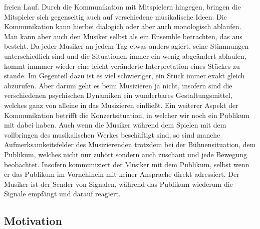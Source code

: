 freien Lauf. Durch die Kommunikation mit Mitspielern hingegen, bringen die
Mitspieler sich gegenseitig auch auf verschiedene musikalische Ideen. Die
Kommunikation kann hierbei dialogich oder aber auch monologisch ablaufen.
\autocite[61]{doerne:umfassend_musizieren} Man kann aber auch den Musiker selbst
als ein Ensemble betrachten, das aus  besteht.
\autocite[64]{doerne:umfassend_musizieren} Da jeder Musiker an jedem Tag etwas
anders agiert, seine Stimmungen unterschiedlich sind und die Situationen immer
ein wenig abgeändert ablaufen, kommt immmer wieder eine leicht veränderte
Interpretation eines Stückes zu stande. Im Gegenteil dazu ist es viel
schwieriger, ein Stück immer exakt gleich abzurufen. Aber darum geht es beim
Musizieren ja nicht, insofern sind die verschiedenen psychischen Dynamiken ein
wunderbares Gestaltungsmittel, welches ganz von alleine in das Musizieren
einfließt. Ein weiterer Aspekt der Kommunikation betrifft die Konzertsituation,
in welcher wir noch ein Publikum mit dabei haben. Auch wenn die Musiker während
dem Spielen mit dem vollbringen des musikalischen Werkes beschäftigt sind, so
sind manche Aufmerksamkeitsfelder des Musizierenden trotzdem bei der
Bühnensituation, dem Publikum, welches nicht nur zuhört sondern auch zuschaut
und jede Bewegung beobachtet. Insofern kommuniziert der Musiker mit dem
Publikum, selbst wenn er das Publikum im Vornehinein mit keiner Ansprache direkt
adressiert. Der Musiker ist der Sender von Signalen, während das Publikum
wiederum die Signale empfängt und darauf reagiert. 



\subsection{Motivation}

